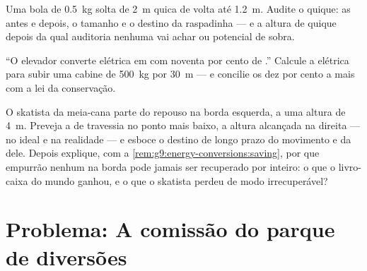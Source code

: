 \begin{exercise}[$\star\star$]\label{exo:g9:energy-conversions:10}
Uma bola de \qty{0.5}{kg} solta de \qty{2}{m} quica de volta até
\qty{1.2}{m}. Audite o quique: as  antes e depois, o tamanho
e o destino da raspadinha --- e a altura de quique depois da qual
auditoria nenhuma vai achar  ou potencial de sobra.
\end{exercise}

\begin{exercise}[$\star\star$]\label{exo:g9:energy-conversions:11}
``O elevador converte  elétrica em  com
noventa por cento de .'' Calcule a  elétrica para
subir uma cabine de \qty{500}{kg} por \qty{30}{m} --- e concilie os
dez por cento a mais com a lei da conservação.
\end{exercise}

\begin{exercise}[$\star\star\star$]\label{exo:g9:energy-conversions:12}
O skatista da meia-cana parte do repouso na borda esquerda, a uma
altura de \qty{4}{m}. Preveja a  de travessia no ponto mais
baixo, a altura alcançada na direita --- no ideal e na realidade ---
e esboce o destino de longo prazo do movimento e da  dele.
Depois explique, com a
\cref{rem:g9:energy-conversions:saving}, por que empurrão nenhum na
borda pode jamais ser recuperado por inteiro: o que o livro-caixa do
mundo ganhou, e o que o skatista perdeu de modo irrecuperável?
\end{exercise}

\section{Problema: A comissão do parque de diversões}

